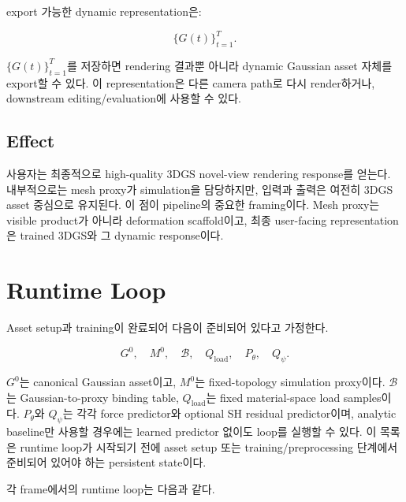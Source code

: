 \documentclass[11pt,a4paper]{article}
\begin{document}
export 가능한 dynamic representation은:

\begin{equation}
\boxed{\{G(t)\}_{t=1}^{T}}.
\end{equation}

$\{G(t)\}_{t=1}^{T}$를 저장하면 rendering 결과뿐 아니라 dynamic Gaussian asset 자체를 export할 수 있다.
이 representation은 다른 camera path로 다시 render하거나, downstream editing/evaluation에 사용할 수 있다.

\subsection*{Effect}

사용자는 최종적으로 high-quality 3DGS novel-view rendering response를 얻는다. 내부적으로는 mesh proxy가 simulation을 담당하지만, 입력과 출력은 여전히 3DGS asset 중심으로 유지된다.
이 점이 pipeline의 중요한 framing이다.
Mesh proxy는 visible product가 아니라 deformation scaffold이고, 최종 user-facing representation은 trained 3DGS와 그 dynamic response이다.

\section{Runtime Loop}

Asset setup과 training이 완료되어 다음이 준비되어 있다고 가정한다.

\begin{equation}
G^0,\quad M^0,\quad \mathcal{B},\quad Q_{\mathrm{load}},\quad P_\theta,\quad Q_\psi.
\end{equation}

$G^0$는 canonical Gaussian asset이고, $M^0$는 fixed-topology simulation proxy이다.
$\mathcal{B}$는 Gaussian-to-proxy binding table, $Q_{\mathrm{load}}$는 fixed material-space load samples이다.
$P_\theta$와 $Q_\psi$는 각각 force predictor와 optional SH residual predictor이며, analytic baseline만 사용할 경우에는 learned predictor 없이도 loop를 실행할 수 있다.
이 목록은 runtime loop가 시작되기 전에 asset setup 또는 training/preprocessing 단계에서 준비되어 있어야 하는 persistent state이다.

각 frame에서의 runtime loop는 다음과 같다.
\end{document}
